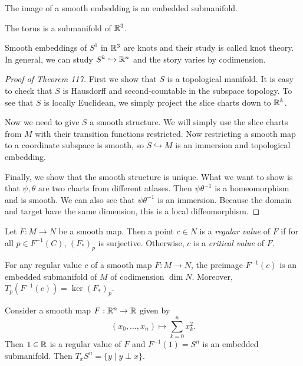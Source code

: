 \documentclass[twoside, 10pt]{article}
\begin{document}
    \begin{thm} The image of a smooth embedding is an embedded submanifold.
    \end{thm}

    \begin{exm} The torus is a submanifold of $\mathbb{R}^3$.  \end{exm}

    \begin{exm} Smooth embeddings of $S^1$ in $\mathbb{R}^3$ are knots and their study
    is called knot theory. In general, we can study $S^k \hookrightarrow \mathbb{R}^n$
and the story varies by codimension.  \end{exm}

    \begin{proof}[Proof of Theorem 117] First we show that $S$ is a topological
        manifold. It is easy to check that $S$ is Hausdorff and
        second-countable in the subspace topology. To see that $S$ is locally
        Euclidean, we simply project the slice charts down to $\mathbb{R}^k$.

        Now we need to give $S$ a smooth structure. We will simply use the
        slice charts from $M$ with their transition functions restricted. Now
        restricting a smooth map to a coordinate subspace is smooth, so $S
        \hookrightarrow M$ is an immersion and topological embedding.

        Finally, we show that the smooth structure is unique. What we want to
    show is that $\psi, \theta$ are two charts from different atlases. Then
$\psi \theta^{-1}$ is a homeomorphism and is smooth. We can also see that $\psi
\theta^{-1}$ is an immersion. Because the domain and target have the same
dimension, this is a local diffeomorphism.  \end{proof}

    \begin{defn} Let $F:M \to N$ be a smooth map. Then a point $c \in N$ is a
    \textit{regular value} of $F$ if for all $p \in F^{-1}(C)$, $(F_*)_p$ is
surjective. Otherwise, $c$ is a \textit{critical value} of $F$.  \end{defn}

    \begin{cor} For any regular value $c$ of a smooth map $F:M \to N$, the
    preimage $F^{-1}(c)$ is an embedded submanifold of $M$ of codimension $\dim
N$. Moreover, $T_p(F^{-1}(c)) = \ker (F_*)_p$.  \end{cor}

    \begin{exm} Consider a smooth map $F: \mathbb{R}^n \to \mathbb{R}$ given by \[ (x_0,
    \ldots, x_n) \mapsto \sum_{k=0}^n x_k^2.\] Then $1 \in \mathbb{R}$ is a regular
    value of $F$ and $F^{-1}(1) = S^n$ is an embedded submanifold. Then $T_xS^n
    = \{y \mid y \perp x\}$.  \end{exm}
\end{document}

